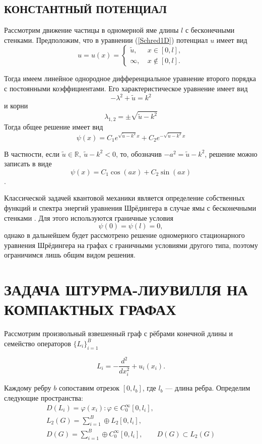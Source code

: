 \documentclass[a4 paper, 12 pt]{extarticle}
\begin{document}
   \subsection{КОНСТАНТНЫЙ ПОТЕНЦИАЛ}
   Рассмотрим движение частицы в одномерной яме длины $l$ с бесконечными стенками.
   Предположим, что в уравнении (\ref{Schred1D}) потенциал $u$ имеет вид 
   $$u = u\left(x\right) = \begin{cases}
   \tilde{u}, & \ x \in \left[0,l\right],\\
   \infty,    & \ x \notin \left[0,l\right].
   \end{cases}$$
   
   Тогда имеем линейное однородное дифференциальное уравнение второго порядка с постоянными коэффициентами. Его характеристическое уравнение имеет вид
   \[-\lambda^2+\tilde{u} = k^2\]
   и корни
   \[\lambda_{1,2}=\pm \sqrt{\tilde{u}-k^2}\]
   Тогда общее решение имеет вид
   \[
   \psi\left(x\right)= C_1 e^{\sqrt{\tilde{u}-k^2}x} + C_2 e^{-\sqrt{\tilde{u}-k^2}x}
   \]
   
   В частности, если $\tilde{u} \in \mathbb{R}, \ \tilde{u}-k^2<0$, то, обозначив $-a^2=\tilde{u}-k^2$, решение можно записать в виде \[\psi\left(x\right)= C_1 \cos\left(ax\right)+ C_2 \sin\left(ax\right)\].
   
   Классической задачей квантовой механики является определение собственных функций и спектра энергий уравнения Шрёдингера в случае ямы с бесконечными стенками \cite{Landau}. Для этого используются граничные условия 
   \[\psi\left(0\right) = \psi\left(l\right) = 0,\]
   однако в дальнейшем будет рассмотрено решение одномерного стационарного уравнения Шрёдингера на графах с граничными условиями другого типа, поэтому ограничимся лишь общим видом решения.
   
   \section{ЗАДАЧА ШТУРМА-ЛИУВИЛЛЯ НА КОМПАКТНЫХ ГРАФАХ}

   Рассмотрим произвольный взвешенный граф с рёбрами конечной длины и семейство операторов $\{L_i\}_{i=1}^B$

   \begin{equation}\label{LOp}
   L_i = -\frac{d^2}{dx_i^2} + u_i(x_i).
   \end{equation}

   Каждому ребру $b$ сопоставим отрезок $[0, l_b]$, где $l_b$ --- длина ребра.
   Определим следующие пространства:
   \begin{gather*}
   D(L_i)={\varphi(x_i):\varphi\in C_0^\infty[0,l_i]},\\
   L_2(G)=\sum_{i=1}^{B}\oplus L_2[0, l_i],\\
   D(G)=\sum_{i=1}^{B}\oplus C_0^\infty[0,l_i],\qquad D(G)\subset L_2(G)
  \end{gather*}
\end{document}
